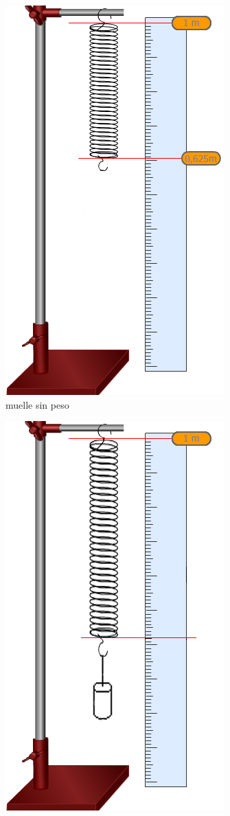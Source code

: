 \documentclass[12pt,a4paper]{book}
\begin{document}
\begin{figure}[h!]
\centering
\begin{subfigure}[b]{0.3\linewidth}
\includegraphics[scale=0.35]{muelle-dibujo1.png}
\caption{muelle sin peso}
\label{fig: muelle sin peso}
\end{subfigure}
\begin{subfigure}[b]{0.3\linewidth}
\includegraphics[scale=0.35]{muelle-dibujo2.png}

\end{subfigure}
\end{figure}
\end{document}
